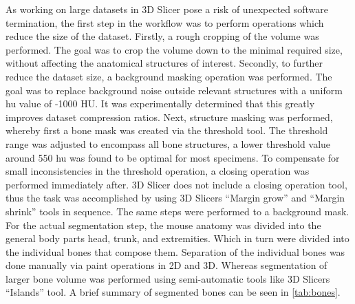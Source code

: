 \noindent
As working on large datasets in 3D Slicer pose a risk of unexpected software termination, the first step in the workflow was to perform operations which reduce the size of the dataset.
Firstly, a rough cropping of the volume was performed.
The goal was to crop the volume down to the minimal required size, without affecting the anatomical structures of interest.
Secondly, to further reduce the dataset size, a background masking operation was performed.
The goal was to replace background noise outside relevant structures with a uniform \acrshort{hu} value of -1000 HU.
It was experimentally determined that this greatly improves dataset compression ratios.
Next, structure masking was performed, whereby first a bone mask was created via the threshold tool.
The threshold range was adjusted to encompass all bone structures, a lower threshold value around 550 \acrshort{hu} was found to be optimal for most specimens.
To compensate for small inconsistencies in the threshold operation, a closing operation was performed immediately after.
3D Slicer does not include a closing operation tool, thus the task was
accomplished by using 3D Slicers ``Margin grow'' and ``Margin shrink'' tools in sequence.
The same steps were performed to a background mask.
For the actual segmentation step, the mouse anatomy was divided into the general body parts head, trunk, and extremities.
Which in turn were divided into the individual bones that compose them.
Separation of the individual bones was done manually via paint operations in 2D and 3D.
Whereas segmentation of larger bone volume was performed using semi-automatic tools like 3D Slicers ``Islands'' tool.
A brief summary of segmented bones can be seen in \cref{tab:bones}.
